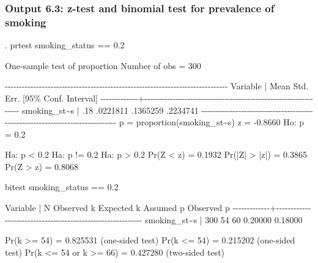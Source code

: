 \documentclass[
]{memoir}
\newenvironment{Shaded}{\begin{snugshade}}{\end{snugshade}}
\newcommand{\NormalTok}[1]{#1}
\begin{document}
\hypertarget{output-6.3-z-test-and-binomial-test-for-prevalence-of-smoking}{%
\subsubsection{Output 6.3: z-test and binomial test for prevalence of smoking}\label{output-6.3-z-test-and-binomial-test-for-prevalence-of-smoking}}

\begin{Shaded}
\begin{Highlighting}[]
\NormalTok{. prtest smoking\_status == 0.2}

\NormalTok{One{-}sample test of proportion                   Number of obs      =       300}

\NormalTok{{-}{-}{-}{-}{-}{-}{-}{-}{-}{-}{-}{-}{-}{-}{-}{-}{-}{-}{-}{-}{-}{-}{-}{-}{-}{-}{-}{-}{-}{-}{-}{-}{-}{-}{-}{-}{-}{-}{-}{-}{-}{-}{-}{-}{-}{-}{-}{-}{-}{-}{-}{-}{-}{-}{-}{-}{-}{-}{-}{-}{-}{-}{-}{-}{-}{-}{-}{-}{-}{-}{-}{-}{-}{-}{-}{-}{-}{-}}
\NormalTok{    Variable |       Mean   Std. Err.                     [95\% Conf. Interval]}
\NormalTok{{-}{-}{-}{-}{-}{-}{-}{-}{-}{-}{-}{-}{-}+{-}{-}{-}{-}{-}{-}{-}{-}{-}{-}{-}{-}{-}{-}{-}{-}{-}{-}{-}{-}{-}{-}{-}{-}{-}{-}{-}{-}{-}{-}{-}{-}{-}{-}{-}{-}{-}{-}{-}{-}{-}{-}{-}{-}{-}{-}{-}{-}{-}{-}{-}{-}{-}{-}{-}{-}{-}{-}{-}{-}{-}{-}{-}{-}}
\NormalTok{smoking\_st\textasciitilde{}s |        .18   .0221811                      .1365259    .2234741}
\NormalTok{{-}{-}{-}{-}{-}{-}{-}{-}{-}{-}{-}{-}{-}{-}{-}{-}{-}{-}{-}{-}{-}{-}{-}{-}{-}{-}{-}{-}{-}{-}{-}{-}{-}{-}{-}{-}{-}{-}{-}{-}{-}{-}{-}{-}{-}{-}{-}{-}{-}{-}{-}{-}{-}{-}{-}{-}{-}{-}{-}{-}{-}{-}{-}{-}{-}{-}{-}{-}{-}{-}{-}{-}{-}{-}{-}{-}{-}{-}}
\NormalTok{    p = proportion(smoking\_st\textasciitilde{}s)                                  z =  {-}0.8660}
\NormalTok{Ho: p = 0.2}

\NormalTok{     Ha: p \textless{} 0.2                 Ha: p != 0.2                   Ha: p \textgreater{} 0.2}
\NormalTok{ Pr(Z \textless{} z) = 0.1932         Pr(|Z| \textgreater{} |z|) = 0.3865          Pr(Z \textgreater{} z) = 0.8068}

\NormalTok{bitest smoking\_status == 0.2}

\NormalTok{    Variable |        N   Observed k   Expected k   Assumed p   Observed p}
\NormalTok{{-}{-}{-}{-}{-}{-}{-}{-}{-}{-}{-}{-}{-}+{-}{-}{-}{-}{-}{-}{-}{-}{-}{-}{-}{-}{-}{-}{-}{-}{-}{-}{-}{-}{-}{-}{-}{-}{-}{-}{-}{-}{-}{-}{-}{-}{-}{-}{-}{-}{-}{-}{-}{-}{-}{-}{-}{-}{-}{-}{-}{-}{-}{-}{-}{-}{-}{-}{-}{-}{-}{-}{-}{-}}
\NormalTok{smoking\_st\textasciitilde{}s |      300         54           60       0.20000      0.18000}

\NormalTok{  Pr(k \textgreater{}= 54)            = 0.825531  (one{-}sided test)}
\NormalTok{  Pr(k \textless{}= 54)            = 0.215202  (one{-}sided test)}
\NormalTok{  Pr(k \textless{}= 54 or k \textgreater{}= 66) = 0.427280  (two{-}sided test)}
\end{Highlighting}
\end{Shaded}
\end{document}
